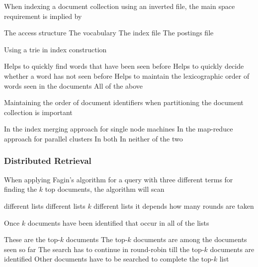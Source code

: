 \documentclass[12pt,a4paper,answers]{exam} %
\begin{document}
\begin{flushleft}
\begin{multicols*}{2}
\begin{questions}
\question When indexing a document collection using an inverted file, the main space requirement is implied by
\begin{checkboxes}
\choice The access structure
\choice The vocabulary
\choice The index file
\CorrectChoice The postings file
\end{checkboxes}

\question Using a trie in index construction
\begin{checkboxes}
\choice Helps to quickly find words that have been seen before
\choice Helps to quickly decide whether a word has not seen before
\choice Helps to maintain the lexicographic order of words seen in the documents
\CorrectChoice All of the above
\end{checkboxes}

\question Maintaining the order of document identifiers when partitioning the document collection is important
\begin{checkboxes}
\CorrectChoice In the index merging approach for single node machines
\choice In the map-reduce approach for parallel clusters
\choice In both
\choice In neither of the two
\end{checkboxes}


\subsubsection{Distributed Retrieval}

\question When applying Fagin’s algorithm for a query with three different terms for finding the $k$ top documents, the algorithm will scan
\begin{checkboxes}
 different lists
 different lists
\choice $k$ different lists
\choice it depends how many rounds are taken
\end{checkboxes}

\question Once $k$ documents have been identified that occur in all of the lists
\begin{checkboxes}
\choice These are the top-$k$ documents
\CorrectChoice The top-$k$ documents are among the documents seen so far
\choice The search has to continue in round-robin till the top-$k$ documents are identified
\choice Other documents have to be searched to complete the top-$k$ list
\end{checkboxes}


\end{questions}
\end{multicols*}
\end{flushleft}
\end{document}
